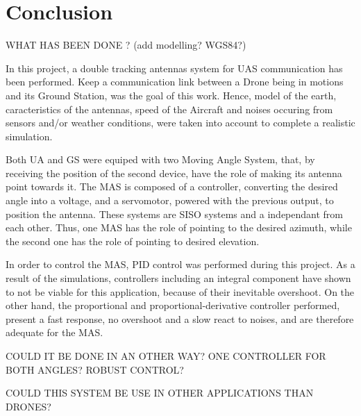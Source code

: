 \chapter{Conclusion}\label{ch:conclusion}

WHAT HAS BEEN DONE ? (add modelling? WGS84?)  

In this project, a double tracking antennas system for UAS communication has been performed. Keep a communication link between a Drone being in motions and its Ground Station, was the goal of this work. Hence, model of the earth, caracteristics of the antennas, speed of the Aircraft and noises occuring from sensors and/or weather conditions, were taken into account to complete a realistic simulation.

Both UA and GS were equiped with two Moving Angle System, that, by receiving the position of the second device, have the role of making its antenna point towards it. The MAS is composed of a controller, converting the desired angle into a voltage, and a servomotor, powered with the previous output, to position the antenna. These systems are SISO systems and a independant from each other. Thus, one MAS has the role of pointing to the desired azimuth, while the second one has the role of pointing to desired elevation.

In order to control the MAS, PID control was performed during this project. As a result of the simulations, controllers including an integral component have shown to not be viable for this application, because of their inevitable overshoot. On the other hand, the proportional and proportional-derivative controller performed, present a fast response, no overshoot and a slow react to noises, and are therefore adequate for the MAS.




COULD IT BE DONE IN AN OTHER WAY? ONE CONTROLLER FOR BOTH ANGLES? ROBUST CONTROL?

COULD THIS SYSTEM BE USE IN OTHER APPLICATIONS THAN DRONES?

